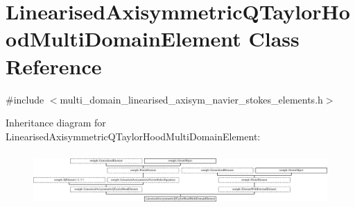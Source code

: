 \hypertarget{classLinearisedAxisymmetricQTaylorHoodMultiDomainElement}{}\section{Linearised\+Axisymmetric\+Q\+Taylor\+Hood\+Multi\+Domain\+Element Class Reference}
\label{classLinearisedAxisymmetricQTaylorHoodMultiDomainElement}


{\ttfamily \#include $<$multi\+\_\+domain\+\_\+linearised\+\_\+axisym\+\_\+navier\+\_\+stokes\+\_\+elements.\+h$>$}

Inheritance diagram for Linearised\+Axisymmetric\+Q\+Taylor\+Hood\+Multi\+Domain\+Element\+:\begin{figure}[H]
\begin{center}
\leavevmode
\includegraphics[height=2.046783cm]{classLinearisedAxisymmetricQTaylorHoodMultiDomainElement}
\end{center}
\end{figure}
